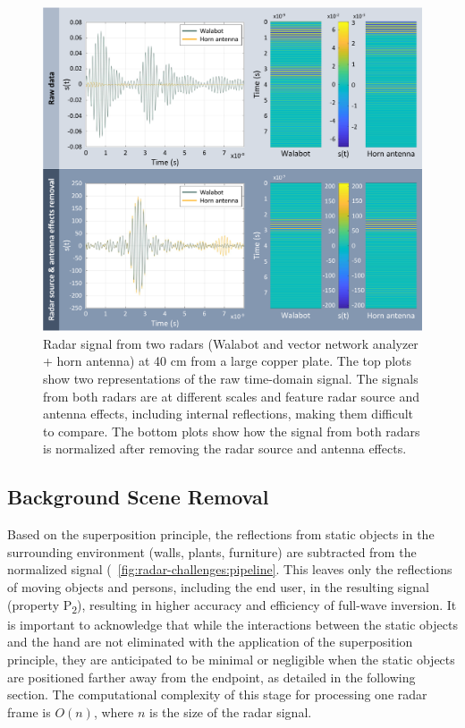 \begin{figure}
    \centering
    \includegraphics[width=\linewidth]{Figures/RadarChallenges/Pipeline/radar-equivalence.pdf}
    \vspace{-12pt}
    \caption{Radar signal from two radars (Walabot and vector network analyzer + horn antenna) at 40 cm from a large copper plate. The top plots show two representations of the raw time-domain signal. The signals from both radars are at different scales and feature radar source and antenna effects, including internal reflections, making them difficult to compare. The bottom plots show how the signal from both radars is normalized after removing the radar source and antenna effects.}
    \label{fig:radar-challenges:radar-equivalence}
    \vspace{-14pt}
\end{figure}

\subsection{Background Scene Removal} \label{sec:radar-challenges:processing-strategy:background-scene}
Based on the superposition principle, the reflections from static objects in the surrounding environment (\eg walls, plants, furniture) are subtracted from the normalized signal (\fig~\ref{fig:radar-challenges:pipeline}. This leaves only the reflections of moving objects and persons, including the end user, in the resulting signal (property P\textsubscript{2}), resulting in higher accuracy and efficiency of full-wave inversion. It is important to acknowledge that while the interactions between the static objects and the hand are not eliminated with the application of the superposition principle, they are anticipated to be minimal or negligible when the static objects are positioned farther away from the endpoint, as detailed in the following section.
% 
The computational complexity of this stage for processing one radar frame is $O(n)$, where $n$ is the size of the radar signal.

